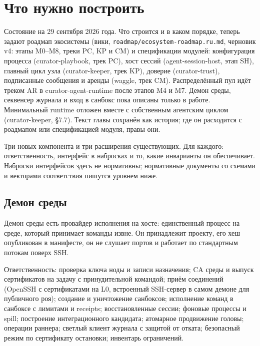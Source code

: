 \chapter{Что нужно построить}

\begin{warnbox}
Состояние на 29 сентября 2026 года. Что строится и в каком порядке, теперь задают роадмап экосистемы (вики, \texttt{roadmap/ecosystem-roadmap.ru.md}, черновик v4: этапы M0--M8, треки PC, KP и CM) и спецификации модулей: конфигурация процесса (curator-playbook, трек PC), хост сессий (agent-session-host, этап SH), главный цикл узла (curator-keeper, трек KP), доверие (curator-trust), подписанные сообщения и аренды (waggle, трек CM). Распределённый пул идёт треком AR в curator-agent-runtime после этапов M4 и M7. Демон среды, секвенсер журнала и вход в санбокс пока описаны только в работе. Минимальный runtime отложен вместе с собственным агентским циклом (curator-keeper, §7.7). Текст главы сохранён как история; где он расходится с роадмапом или спецификацией модуля, правы они.
\end{warnbox}

Три новых компонента и три расширения существующих. Для каждого: ответственность, интерфейс в набросках и то, какие инварианты он обеспечивает. Наброски интерфейсов здесь не нормативны; нормативные документы со схемами и векторами соответствия пишутся уровнем ниже.

\section{Демон среды}

Демон среды есть провайдер исполнения на хосте: единственный процесс на среде, который принимает команды извне. Он принадлежит проекту, его хеш опубликован в манифесте, он не слушает портов и работает по стандартным потокам поверх SSH.

Ответственность: проверка ключа ноды и записи назначения; CA среды и выпуск сертификатов на задачу с принудительной командой; приём соединений (OpenSSH с сертификатами на L0, встроенный SSH-сервер в самом демоне для публичного роя); создание и уничтожение санбоксов; исполнение команд в санбоксе с лимитами и receipts; восстановленные сессии; фоновые процессы и spill; построение интеграционного кандидата; атомарное продвижение головы; операции раннера; светлый клиент журнала с защитой от отката; безопасный режим по сертификату остановки; инвентарь ограничений.

